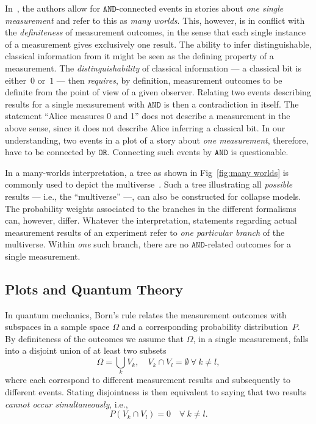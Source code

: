 \documentclass[aps,pra,twocolumn]{revtex4-1}
\newcommand{\AND}{\mathtt{AND}}
\newcommand{\OR}{\mathtt{OR}}
\theoremstyle{definition}
\theoremstyle{remark}
\begin{document}
In~\cite{FrRen}, the authors allow for $\AND$-connected events in stories about \emph{one single measurement} and refer to this as \emph{many worlds}. 
This, however, is in conflict with the \emph{definiteness} of measurement outcomes, in the sense that each single instance of a measurement gives exclusively one result. The ability to infer distinguishable, classical information from it might be seen as the defining property of a measurement.
The \emph{distinguishability} of classical information --- a classical bit is either~$0$ or~$1$ --- then \emph{requires}, by definition, measurement outcomes to be definite from the point of view of a given observer.
Relating two events describing results for a single measurement with $\AND$ is then a contradiction in itself. 
The statement ``Alice measures 0 and 1'' does not describe a measurement in the above sense, since it does not describe Alice inferring a classical bit.
In our understanding, two events in a plot of a story about \emph{one measurement}, therefore, have to be connected by $\OR$. 
Connecting such events by $\AND$ is questionable.

In a many-worlds interpretation, a tree as shown in Fig~\ref{fig:many worlds} is commonly used to depict the multiverse~\cite{wallace2012emergent}.
Such a tree illustrating all \emph{possible} results --- i.e., the ``multiverse'' ---, can also be constructed for collapse models. 
The probability weights associated to the branches in the different formalisms can, however, differ. 
Whatever the interpretation, statements regarding actual measurement results of an experiment refer to \emph{one particular branch} of the multiverse. 
Within \emph{one} such branch, there are no $\AND$-related outcomes for a single measurement.

\subsection{Plots and Quantum Theory}
\label{ssec:inf_qm}
\noindent
In quantum mechanics, Born's rule relates the measurement outcomes with subspaces in a sample space $\Omega$ and a corresponding probability distribution~$P$.
By definiteness of the outcomes we assume that $\Omega$, in a single measurement, falls into a disjoint union of at least two subsets
\begin{equation*}
  \Omega = \bigcup_k V_k, \quad V_k \cap V_l = \emptyset \ \forall \ k\neq l,
\end{equation*}
where each correspond to different measurement results and subsequently to different events. 
Stating disjointness is then equivalent to saying that two results \emph{cannot occur simultaneously}, i.e., 
\begin{equation*}
  P(V_k\cap V_l) = 0 \quad \forall \ k \neq l.
\end{equation*}
\end{document}
